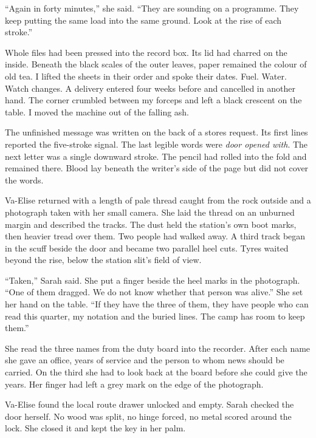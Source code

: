 ``Again in forty minutes,'' she said. ``They are sounding on a programme. They keep putting the same load into the same ground. Look at the rise of each stroke.''\par

Whole files had been pressed into the record box. Its lid had charred on the inside. Beneath the black scales of the outer leaves, paper remained the colour of old tea. I lifted the sheets in their order and spoke their dates. Fuel. Water. Watch changes. A delivery entered four weeks before and cancelled in another hand. The corner crumbled between my forceps and left a black crescent on the table. I moved the machine out of the falling ash.\par

The unfinished message was written on the back of a stores request. Its first lines reported the five-stroke signal. The last legible words were \emph{door opened with}. The next letter was a single downward stroke. The pencil had rolled into the fold and remained there. Blood lay beneath the writer's side of the page but did not cover the words.\par

Va-Elise returned with a length of pale thread caught from the rock outside and a photograph taken with her small camera. She laid the thread on an unburned margin and described the tracks. The dust held the station's own boot marks, then heavier tread over them. Two people had walked away. A third track began in the scuff beside the door and became two parallel heel cuts. Tyres waited beyond the rise, below the station slit's field of view.\par

``Taken,'' Sarah said. She put a finger beside the heel marks in the photograph. ``One of them dragged. We do not know whether that person was alive.'' She set her hand on the table. ``If they have the three of them, they have people who can read this quarter, my notation and the buried lines. The camp has room to keep them.''\par

She read the three names from the duty board into the recorder. After each name she gave an office, years of service and the person to whom news should be carried. On the third she had to look back at the board before she could give the years. Her finger had left a grey mark on the edge of the photograph.\par

Va-Elise found the local route drawer unlocked and empty. Sarah checked the door herself. No wood was split, no hinge forced, no metal scored around the lock. She closed it and kept the key in her palm.\par

